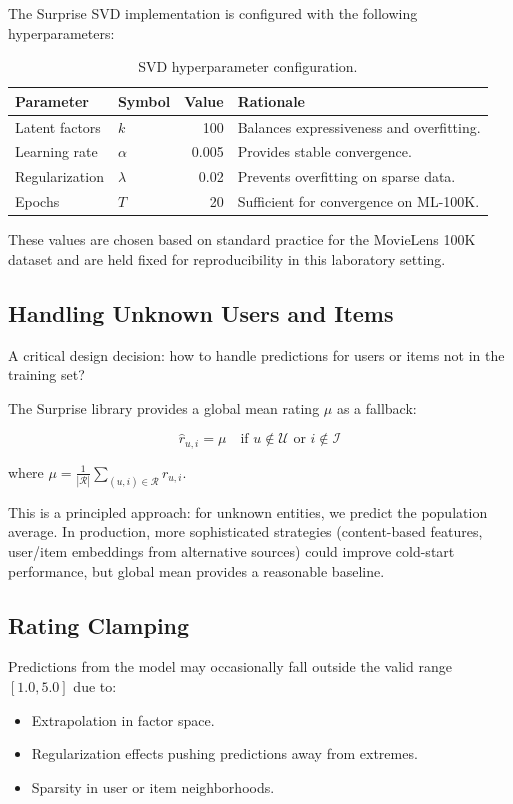 The Surprise SVD implementation is configured with the following hyperparameters:

\begin{table}[!h]
  \centering
  \small
  \begin{tabular}{llrp{7cm}}
    \toprule
    \textbf{Parameter} & \textbf{Symbol} & \textbf{Value} & \textbf{Rationale} \\
    \midrule
    Latent factors & $k$ & 100 & Balances expressiveness and overfitting. \\
    Learning rate & $\alpha$ & 0.005 & Provides stable convergence. \\
    Regularization & $\lambda$ & 0.02 & Prevents overfitting on sparse data. \\
    Epochs & $T$ & 20 & Sufficient for convergence on ML-100K. \\
    \bottomrule
  \end{tabular}
  \caption{SVD hyperparameter configuration.}
\end{table}

These values are chosen based on standard practice for the MovieLens 100K dataset and are held fixed 
for reproducibility in this laboratory setting.

\subsection{Handling Unknown Users and Items}

A critical design decision: how to handle predictions for users or items not in the training set?

The Surprise library provides a global mean rating $\mu$ as a fallback:

\[
  \hat{r}_{u,i} = \mu \quad \text{if } u \notin \mathcal{U} \text{ or } i \notin \mathcal{I}
\]

where $\mu = \frac{1}{|\mathcal{R}|} \sum_{(u,i) \in \mathcal{R}} r_{u,i}$.

This is a principled approach: for unknown entities, we predict the population average. In production, 
more sophisticated strategies (content-based features, user/item embeddings from alternative sources) 
could improve cold-start performance, but global mean provides a reasonable baseline.

\subsection{Rating Clamping}

Predictions from the model may occasionally fall outside the valid range $[1.0, 5.0]$ due to:
\begin{itemize}
  \item Extrapolation in factor space.
  \item Regularization effects pushing predictions away from extremes.
  \item Sparsity in user or item neighborhoods.
\end{itemize}

